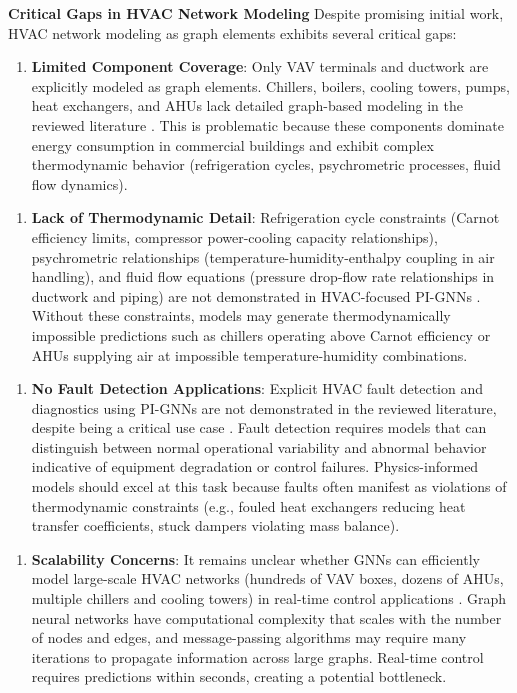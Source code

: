 \documentclass[12pt,a4paper]{article}
\begin{document}
\textbf{Critical Gaps in HVAC Network Modeling}
Despite promising initial work, HVAC network modeling as graph elements exhibits several critical gaps:
\begin{enumerate}
  \item \textbf{Limited Component Coverage}: Only VAV terminals and ductwork are explicitly modeled as graph elements. Chillers, boilers, cooling towers, pumps, heat exchangers, and AHUs lack detailed graph-based modeling in the reviewed literature \cite{ref33}. This is problematic because these components dominate energy consumption in commercial buildings and exhibit complex thermodynamic behavior (refrigeration cycles, psychrometric processes, fluid flow dynamics).
\end{enumerate}
\begin{enumerate}[resume]
  \item \textbf{Lack of Thermodynamic Detail}: Refrigeration cycle constraints (Carnot efficiency limits, compressor power-cooling capacity relationships), psychrometric relationships (temperature-humidity-enthalpy coupling in air handling), and fluid flow equations (pressure drop-flow rate relationships in ductwork and piping) are not demonstrated in HVAC-focused PI-GNNs \cite{ref36}. Without these constraints, models may generate thermodynamically impossible predictions such as chillers operating above Carnot efficiency or AHUs supplying air at impossible temperature-humidity combinations.
\end{enumerate}
\begin{enumerate}[resume]
  \item \textbf{No Fault Detection Applications}: Explicit HVAC fault detection and diagnostics using PI-GNNs are not demonstrated in the reviewed literature, despite being a critical use case \cite{ref37}. Fault detection requires models that can distinguish between normal operational variability and abnormal behavior indicative of equipment degradation or control failures. Physics-informed models should excel at this task because faults often manifest as violations of thermodynamic constraints (e.g., fouled heat exchangers reducing heat transfer coefficients, stuck dampers violating mass balance).
\end{enumerate}
\begin{enumerate}[resume]
  \item \textbf{Scalability Concerns}: It remains unclear whether GNNs can efficiently model large-scale HVAC networks (hundreds of VAV boxes, dozens of AHUs, multiple chillers and cooling towers) in real-time control applications \cite{ref26}. Graph neural networks have computational complexity that scales with the number of nodes and edges, and message-passing algorithms may require many iterations to propagate information across large graphs. Real-time control requires predictions within seconds, creating a potential bottleneck.
\end{enumerate}
\end{document}
